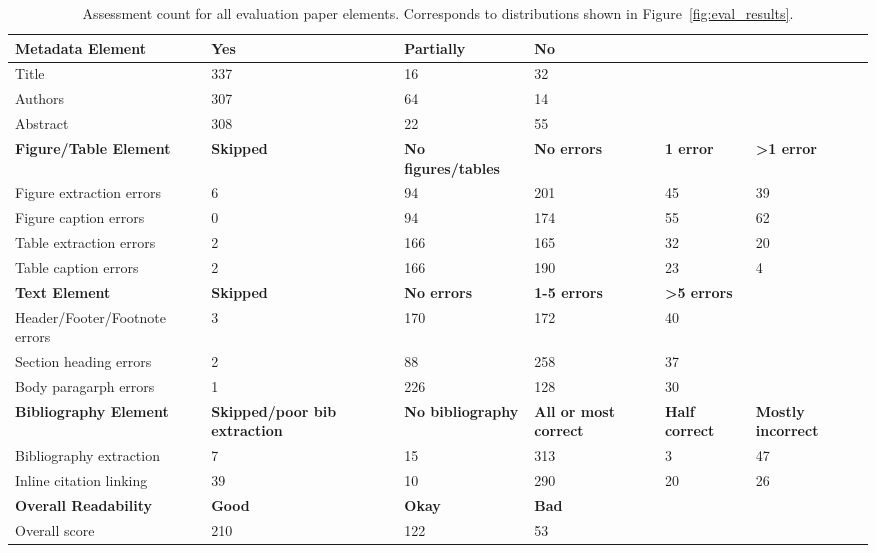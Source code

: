 \begin{table}[h!]
\small
    \centering
    \begin{tabularx}{\linewidth}{L{38mm}L{18mm}L{18mm}L{18mm}L{18mm}L{18mm}}
    \toprule
        \textbf{Metadata Element} & \textbf{Yes} & \textbf{Partially} & \textbf{No} & & \\
    \midrule
        Title & 337 & 16 & 32 & & \\
        Authors & 307 & 64 & 14 & & \\
        Abstract & 308 & 22 & 55 & & \\
    \midrule
        \textbf{Figure/Table Element} & \textbf{Skipped} & \textbf{No figures/tables} & \textbf{No errors} & \textbf{1 error} & \textbf{>1 error} \\
    \midrule
        Figure extraction errors & 6 & 94 & 201 & 45 & 39 \\
        Figure caption errors & 0 & 94 & 174 & 55 & 62 \\
        Table extraction errors & 2 & 166 & 165 & 32 & 20 \\
        Table caption errors & 2 & 166 & 190 & 23 & 4 \\
    \midrule
        \textbf{Text Element} & \textbf{Skipped} & \textbf{No errors} & \textbf{1-5 errors} & \textbf{>5 errors} & \\
    \midrule
        Header/Footer/Footnote errors & 3 & 170 & 172 & 40 & \\
        Section heading errors & 2 & 88 & 258 & 37 & \\
        Body paragarph errors & 1 & 226 & 128 & 30 & \\
    \midrule
        \textbf{Bibliography Element} & \textbf{Skipped/poor bib extraction} & \textbf{No bibliography} & \textbf{All or most correct} & \textbf{Half correct} & \textbf{Mostly incorrect} \\
    \midrule
        Bibliography extraction & 7 & 15 & 313 & 3 & 47 \\
        Inline citation linking & 39 & 10 & 290 & 20 & 26 \\
    \midrule
        \textbf{Overall Readability} & \textbf{Good} & \textbf{Okay} & \textbf{Bad} & & \\
    \midrule
        Overall score & 210 & 122 & 53 & & \\
    \bottomrule
    \end{tabularx}
    \caption{Assessment count for all evaluation paper elements. Corresponds to distributions shown in Figure~\ref{fig:eval_results}.}
    \label{tab:eval_raw_by_element}

\end{table}
